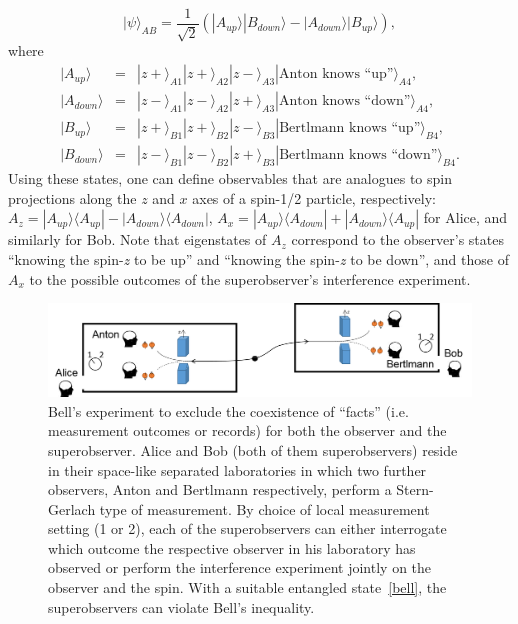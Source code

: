 \documentclass[12pt]{article}
\begin{document}
\begin{equation}
|\psi\rangle_{AB} = \frac{1}{\sqrt{2}} (|A_{up}\rangle|B_{down}\rangle - |A_{down}\rangle |B_{up}\rangle), \label{bell}
\end{equation}
where 
\begin{eqnarray}
|A_{up}\rangle &=& |z+\rangle_{A1} |z+\rangle_{A2}|z-\rangle_{A3}|\mbox{Anton knows ``up''}\rangle_{A4}, \nonumber  \\
|A_{down}\rangle &=&|z-\rangle_{A1}|z-\rangle_{A2}|z+\rangle_{A3} |\mbox{Anton knows ``down''}\rangle_{A4}, \nonumber \\
|B_{up}\rangle &=& |z+\rangle_{B1}|z+\rangle_{B2}|z-\rangle_{B3}|\mbox{Bertlmann knows ``up''}\rangle_{B4}, \nonumber \\
|B_{down}\rangle&=& |z-\rangle_{B1}|z-\rangle_{B2}|z+\rangle_{B3} |\mbox{Bertlmann knows ``down''}\rangle_{B4}. \nonumber
\end{eqnarray}
Using these states, one can define observables that are analogues to spin projections along the $z$ and $x$ axes of a spin-1/2 particle, respectively: $A_z=|A_{up}\rangle \langle A_{up}| - |A_{down} \rangle \langle A_{down}|$, $A_x= |A_{up}\rangle \langle A_{down}| + |A_{down} \rangle \langle A_{up}|$ for Alice, and similarly for Bob. Note that eigenstates of $A_z$ correspond to the observer's states ``knowing the spin-{\it z} to be up'' and ``knowing the spin-{\it z} to be down'', and those of $A_x$ to the possible outcomes of the superobserver's interference experiment.

\begin{figure}
\begin{center}
\includegraphics[width=14.2cm]{Slika3.png}
\end{center}
\caption{Bell's experiment to exclude the coexistence of ``facts'' (i.e. measurement outcomes or records) for both the observer and the superobserver. Alice and Bob (both of them superobservers) reside in their space-like separated laboratories in which two further observers, Anton and Bertlmann respectively, perform a Stern-Gerlach type of measurement. By choice of local measurement setting (1 or 2), each of the superobservers can either interrogate which outcome the respective observer in his laboratory has observed or perform the interference experiment jointly on the observer and the spin. With a suitable entangled state~\ref{bell}, the superobservers can violate Bell's inequality.} \label{figure3}
\end{figure}
\end{document}
